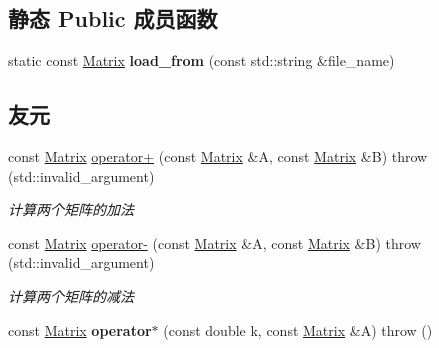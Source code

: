 \subsection*{静态 Public 成员函数}
\begin{DoxyCompactItemize}
\item 
\mbox{\label{classkerbal_1_1math_1_1_matrix_a19d3d26c63d7598205a6d064b68a6bd4}} 
static const \hyperlink{classkerbal_1_1math_1_1_matrix}{Matrix} {\bfseries load\+\_\+from} (const std\+::string \&file\+\_\+name)
\end{DoxyCompactItemize}
\subsection*{友元}
\begin{DoxyCompactItemize}
\item 
const \hyperlink{classkerbal_1_1math_1_1_matrix}{Matrix} \hyperlink{classkerbal_1_1math_1_1_matrix_a68ca5b1d7d0aaf615a63771788562210}{operator+} (const \hyperlink{classkerbal_1_1math_1_1_matrix}{Matrix} \&A, const \hyperlink{classkerbal_1_1math_1_1_matrix}{Matrix} \&B)  throw (std\+::invalid\+\_\+argument)
\begin{DoxyCompactList}\small\item\em 计算两个矩阵的加法 \end{DoxyCompactList}\item 
const \hyperlink{classkerbal_1_1math_1_1_matrix}{Matrix} \hyperlink{classkerbal_1_1math_1_1_matrix_a4fc480fab44a4d6c69a6cf92f91522ad}{operator-\/} (const \hyperlink{classkerbal_1_1math_1_1_matrix}{Matrix} \&A, const \hyperlink{classkerbal_1_1math_1_1_matrix}{Matrix} \&B)  throw (std\+::invalid\+\_\+argument)
\begin{DoxyCompactList}\small\item\em 计算两个矩阵的减法 \end{DoxyCompactList}\item 
\mbox{\label{classkerbal_1_1math_1_1_matrix_ae4dae004adfcec267b060864b1fcfa41}} 
const \hyperlink{classkerbal_1_1math_1_1_matrix}{Matrix} {\bfseries operator$\ast$} (const double k, const \hyperlink{classkerbal_1_1math_1_1_matrix}{Matrix} \&A)  throw ()
\item 
\mbox{\label{classkerbal_1_1math_1_1_matrix_a2c961c7157712ed49125788e6bee2e23}} 

\end{DoxyCompactItemize}

